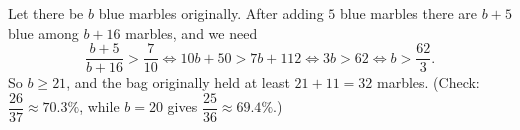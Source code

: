 Let there be $b$ blue marbles originally. After adding $5$ blue marbles there are $b+5$ blue among $b+16$ marbles, and we need
\[
\dfrac{b+5}{b+16}>\dfrac{7}{10}\iff10b+50>7b+112\iff3b>62\iff b>\dfrac{62}{3}.
\]
So $b\ge21$, and the bag originally held at least $21+11=\boxed{32}$ marbles. (Check: $\dfrac{26}{37}\approx70.3\%$, while $b=20$ gives $\dfrac{25}{36}\approx69.4\%$.)
